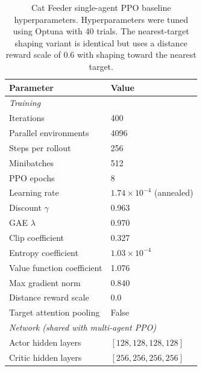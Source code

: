 \begin{table}[h]
\centering
\begin{tabular}{ll}
\toprule
Parameter & Value \\
\midrule
\multicolumn{2}{l}{\textit{Training}} \\
Iterations & 400 \\
Parallel environments & 4096 \\
Steps per rollout & 256 \\
Minibatches & 512 \\
PPO epochs & 8 \\
Learning rate & $1.74 \times 10^{-4}$ (annealed) \\
Discount $\gamma$ & 0.963 \\
GAE $\lambda$ & 0.970 \\
Clip coefficient & 0.327 \\
Entropy coefficient & $1.03 \times 10^{-4}$ \\
Value function coefficient & 1.076 \\
Max gradient norm & 0.840 \\
Distance reward scale & 0.0 \\
Target attention pooling & False \\
\midrule
\multicolumn{2}{l}{\textit{Network (shared with multi-agent PPO)}} \\
Actor hidden layers & $[128, 128, 128, 128]$ \\
Critic hidden layers & $[256, 256, 256, 256]$ \\
\bottomrule
\end{tabular}
\caption{Cat Feeder single-agent PPO baseline hyperparameters. Hyperparameters were tuned using Optuna with 40 trials. The nearest-target shaping variant is identical but uses a distance reward scale of 0.6 with shaping toward the nearest target.}
\end{table}

